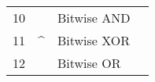 \documentclass{article}
\begin{document}
\begin{table}[htb]
{\begin{tabular}{c l l l}
10 &                                                                                                               & Bitwise AND                                                                                                                          &                                                                                                                                                                                                                                                                                                                                                                                                                                                                                                                                                                                                                                \\
11 & \^{}                                                                                                          & Bitwise XOR                                                                                                                          &                                                                                                                                                                                                                                                                                                                                                                                                                                                                                                                                                                                                                                \\
12 & \textbar{}                                                                                                    & Bitwise OR                                                                                                                           &                                                                                                                                                                                                                                                                                                                                                                                                                                                                                                                                                                                                                                \\

\end{tabular}}
\end{table}
\end{document}
